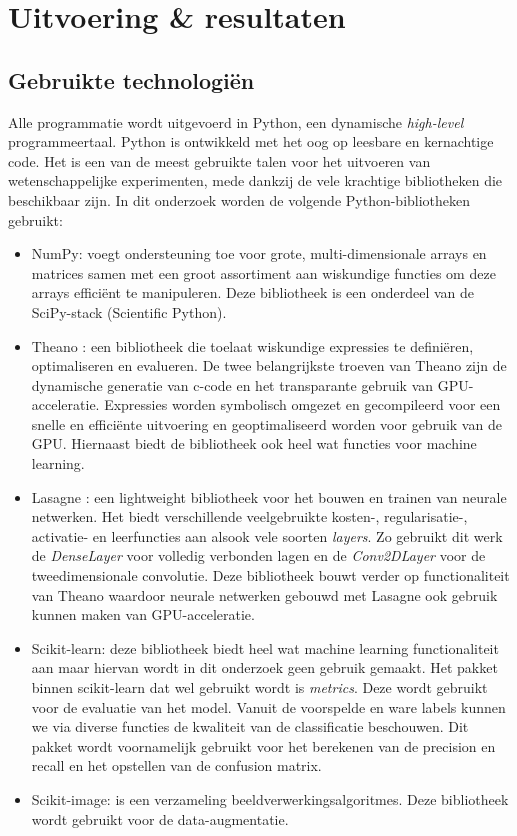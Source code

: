\chapter{Uitvoering \& resultaten}
\section{Gebruikte technologi\"en}
Alle programmatie wordt uitgevoerd in Python, een dynamische \textit{high-level} programmeertaal. Python is ontwikkeld met het oog op leesbare en kernachtige code. Het is een van de meest gebruikte talen voor het uitvoeren van wetenschappelijke experimenten, mede dankzij de vele krachtige bibliotheken die beschikbaar zijn. In dit onderzoek worden de volgende Python-bibliotheken gebruikt:

\begin{itemize}
	\item NumPy: voegt ondersteuning toe voor grote, multi-dimensionale arrays en matrices samen met een groot assortiment aan wiskundige functies om deze arrays effici\"ent te  manipuleren. Deze bibliotheek is een onderdeel van de SciPy-stack (Scientific Python).
	\item Theano \cite{theano}:  een bibliotheek die toelaat wiskundige expressies te defini\"eren, optimaliseren en evalueren. De twee belangrijkste troeven van Theano zijn de dynamische generatie van c-code en het transparante gebruik van GPU-acceleratie. Expressies worden symbolisch omgezet en gecompileerd voor een snelle en effici\"ente uitvoering en geoptimaliseerd worden voor gebruik van de GPU.  Hiernaast biedt de bibliotheek ook heel wat functies voor machine learning. 
	\item Lasagne \cite{lasagne}: een lightweight bibliotheek voor het bouwen en trainen van neurale netwerken. Het biedt verschillende veelgebruikte kosten-, regularisatie-, activatie- en leerfuncties aan alsook vele soorten \textit{layers}. Zo gebruikt dit werk de \textit{DenseLayer} voor volledig verbonden lagen en de \textit{Conv2DLayer} voor de tweedimensionale convolutie. Deze bibliotheek bouwt verder op functionaliteit van Theano waardoor neurale netwerken gebouwd met Lasagne ook gebruik kunnen maken van GPU-acceleratie.
	\item Scikit-learn: deze bibliotheek biedt heel wat machine learning functionaliteit aan maar hiervan wordt in dit onderzoek geen gebruik gemaakt. Het pakket binnen scikit-learn dat wel gebruikt wordt is \textit{metrics}. Deze wordt gebruikt voor de evaluatie van het model. Vanuit de voorspelde en ware labels kunnen we via diverse functies de kwaliteit van de classificatie beschouwen. Dit pakket wordt voornamelijk gebruikt voor het berekenen van de precision en recall en het opstellen van de confusion matrix.
	\item Scikit-image: is een verzameling beeldverwerkingsalgoritmes. Deze bibliotheek wordt gebruikt voor de data-augmentatie.
	
\end{itemize}
